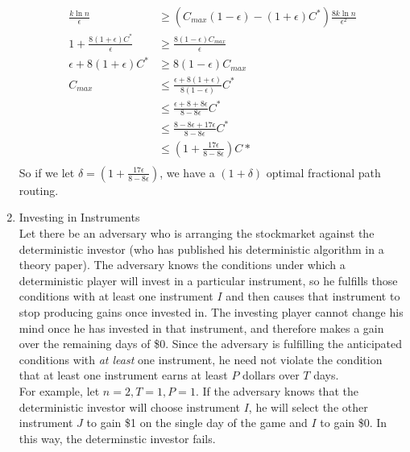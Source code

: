 \documentclass[a4paper]{article}
\begin{document}
\begin{enumerate}
\begin{align*}
		\frac{k \ln n}{\epsilon} &\geq (C_{max}(1-\epsilon) - (1+\epsilon)C^*)\frac{8k \ln n} {\epsilon ^2} \\
		1 + \frac{8(1+\epsilon )C^*}{\epsilon} &\geq \frac{8(1-\epsilon)C_{max}}{\epsilon} \\
		\epsilon + 8(1+ \epsilon)C^* &\geq 8(1-\epsilon)C_{max} \\
		C_{max} &\leq \frac{\epsilon + 8 (1 + \epsilon)}{8(1-\epsilon)}C^* \\
		&\leq \frac{\epsilon + 8 + 8\epsilon}{8-8\epsilon}C^* \\
		&\leq \frac{8 - 8\epsilon + 17\epsilon}{8-8\epsilon}C^* \\
		&\leq (1 + \frac{17\epsilon}{8-8\epsilon})C* \\
	\end{align*}
So if we let $\delta = (1 + \frac{17\epsilon}{8-8\epsilon})$, we have a $(1+ \delta)$ optimal fractional path routing.
\item Investing in Instruments \\
Let there be an adversary who is arranging the stockmarket against the deterministic investor (who has published his deterministic algorithm in a theory paper).  The adversary knows the conditions under which a deterministic player will invest in a particular instrument, so he fulfills those conditions with at least one instrument $I$ and then causes that instrument to stop producing gains once invested in.  The investing player cannot change his mind once he has invested in that instrument, and therefore makes a gain over the remaining days of \$0.  Since the adversary is fulfilling the anticipated conditions with \emph{at least} one instrument, he need not violate the condition that at least one instrument earns at least $P$ dollars over $T$ days.\\
For example, let $n=2,T=1,P=1$.  If the adversary knows that the deterministic investor will choose instrument $I$, he will select the other instrument $J$ to gain \$1 on the single day of the game and $I$ to gain \$0.  In this way, the determinstic investor fails.
\end{enumerate}
\end{document}
